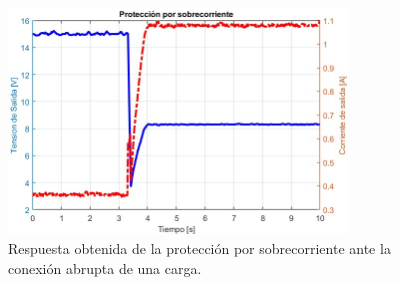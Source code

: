 \begin{figure}[htbp]
    \centering
    \includegraphics[width=0.8\textwidth]{./imagenes/MedicionConPuntaCorriente_proteccionRapida.jpg}
    \caption{Respuesta obtenida de la protección por sobrecorriente ante la conexión abrupta de una carga.}
    \label{F:Pcorriente2}
\end{figure}\par 

